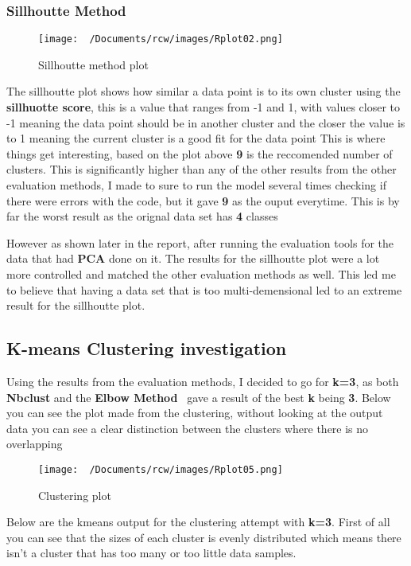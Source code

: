 \documentclass[12pt]{article}
\begin{document}
\subsubsection{Sillhoutte  Method}
\begin{figure}[H]
  \centering
  \texttt{[image: ~/Documents/rcw/images/Rplot02.png]}
  \caption{Sillhoutte method plot}
\end{figure}

The sillhoutte plot shows how similar a data point is to its own cluster using the \textbf{sillhuotte score}, this is a value 
that ranges from -1 and 1, with values closer to -1 meaning the data point should be in another cluster and the closer the value is to 1 meaning the current cluster is a good fit for the data point
This is where things get interesting, based on the plot above \textbf{9} is the reccomended number of clusters. This is significantly higher
than any of the other results from the other evaluation methods,
I made to sure to run the model several times checking if there were errors with the code, but it gave \textbf{9} as the ouput everytime. This is by far the worst result as the orignal data set has \textbf{4} classes

However as shown later in the report, after running the evaluation tools for the data that had \textbf{PCA} done on it. The results for the sillhoutte plot were 
a lot more controlled and matched the other evaluation methods as well. This led me to believe that having a data set that is too multi-demensional led to an extreme result for the sillhoutte plot.

\newpage
\subsection{K-means Clustering investigation}
Using the results from the evaluation methods, I decided to go for \textbf{k=3}, as both \textbf{Nbclust} and the \textbf{Elbow Method} \
gave a result of the best \textbf{k} being \textbf{3}.
Below you can see the plot made from the clustering, without looking at the output data you can see a clear distinction between the clusters where there is 
no overlapping

\begin{figure}[H]
  \centering
  \texttt{[image: ~/Documents/rcw/images/Rplot05.png]}
  \caption{Clustering plot}
\end{figure}

Below are the kmeans output for the clustering attempt with \textbf{k=3}. First of all you can see that the sizes of each cluster is evenly distributed
which means there isn't a cluster that has too many or too little data samples.






\end{document}
